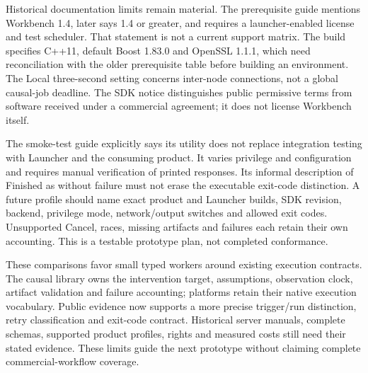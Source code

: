 Historical documentation limits remain material. The prerequisite guide
mentions Workbench 1.4, later says 1.4 or greater, and requires a launcher-enabled
license and test scheduler. That statement is not a current support matrix.
The build specifies C++11, default Boost 1.83.0 and OpenSSL 1.1.1, which need
reconciliation with the older prerequisite table before building an environment.
The Local three-second setting concerns inter-node connections, not a global
causal-job deadline. The SDK notice distinguishes public permissive terms
from software received under a commercial agreement; it does not license
Workbench itself.~\citep{exec24_workflow_contracts_posit}

The smoke-test guide explicitly says its utility does not replace integration
testing with Launcher and the consuming product. It varies privilege and
configuration and requires manual verification of printed responses. Its
informal description of Finished as without failure must not erase the
executable exit-code distinction. A future profile should name exact product
and Launcher builds, SDK revision, backend, privilege mode, network/output
switches and allowed exit codes. Unsupported Cancel, races, missing artifacts
and failures each retain their own accounting. This is a testable prototype
plan, not completed conformance.~\citep{exec24_workflow_contracts_posit}

These comparisons favor small typed workers around existing execution
contracts. The causal library owns the intervention target, assumptions,
observation clock, artifact validation and failure accounting; platforms
retain their native execution vocabulary. Public evidence now supports a
more precise trigger/run distinction, retry classification and exit-code
contract. Historical server manuals, complete schemas, supported product
profiles, rights and measured costs still need their stated evidence. These
limits guide the next prototype without claiming complete commercial-workflow
coverage.


